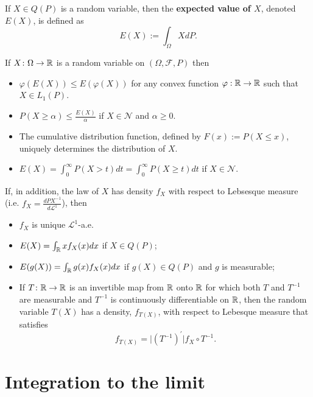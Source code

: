 \begin{definition} If $X\in Q(P)$ is a random variable, then the {\bf expected value of $X$}, denoted $E(X)$, is defined as
\[ E(X):=\int_\Omega XdP. \]
\end{definition}


\begin{theorem}
If $X\colon \Omega\rightarrow \Bbb R$ is a random variable on $(\Omega,\mathcal F, P)$ then
\begin{itemize}
\item $\varphi(E(X))\leq E(\varphi(X))$ for any  convex function $\varphi:\Bbb R\rightarrow \Bbb R$ such that $X\in L_1(P)$.
\item $P(X\geq \alpha)\leq \frac{E(X)}{\alpha}$ if $X\in \mathscr N$ and $\alpha\geq 0$.
\item The cumulative distribution function, defined by $F(x):=P(X\leq x)$, uniquely determines the distribution of $X$.
\item $E(X)= \int_0^\infty P(X>t)dt=\int_0^\infty P(X\geq t)dt$ if $X\in \mathscr N$.
\end{itemize}
If, in addition, the law of $X$ has density $f_X$ with respect to Lebsesque measure (i.e.\! $f_X= \frac{dP\!X^{-1}}{ d\mathcal L^1}$), then
\begin{itemize}
\item $f_X$ is unique $\mathcal L^1$-a.e.
\item $E(X)=\int_{\Bbb R} x f_X(x)d x$ if $X\in Q(P)$;
\item $E(g(X))=\int_{\Bbb R} g(x) f_X(x)dx$ if $g(X)\in Q(P)$ and $g$ is measurable;
\item  If $T\colon \Bbb R\rightarrow \Bbb R$ is an invertible map from $\Bbb R$ onto $\Bbb R$ for which both $T$ and $T^{-1}$ are measurable and  $T^{-1}$ is continuously differentiable on $\Bbb R$, then the random variable $T(X)$ has a density, $f_{T(X)}$, with respect to Lebesque measure that satisfies
\[ f_{T(X)} =  \bigl|(T^{-1})^\prime\bigr| f_X\circ T^{-1}. \]
\end{itemize}
\end{theorem}




\clearpage
\section{Integration to the limit}

